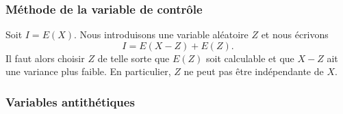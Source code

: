 \subsubsection{Méthode de la variable de contrôle}

Soit \( I=E(X)\). Nous introduisons une variable aléatoire \( Z\) et nous écrivons
\begin{equation}
    I=E(X-Z)+E(Z).
\end{equation}
Il faut alors choisir \( Z\) de telle sorte que \( E(Z)\) soit calculable et que \( X-Z\) ait une variance plus faible. En particulier, \( Z\) ne peut pas être indépendante de \( X\).

\subsubsection{Variables antithétiques}

